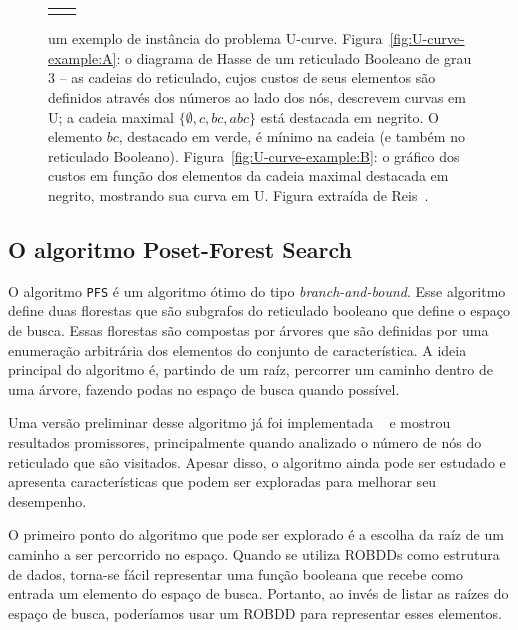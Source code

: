 \documentclass[12pt]{article}
\begin{document}
\begin{figure}[!ht]
\begin{tabular}{c c}
{        \label{fig:U-curve-example:B} 
    }
\end{tabular}
\caption{um exemplo de instância do problema U-curve. 
Figura~\ref{fig:U-curve-example:A}: o diagrama de Hasse de um reticulado
Booleano de grau $3$ -- as cadeias do reticulado, cujos custos de seus
elementos são definidos através dos números ao lado dos nós, descrevem
curvas em U; a cadeia maximal $\{ \emptyset, c, bc, abc \}$ está
destacada em negrito. O elemento $bc$, destacado em verde, é mínimo na
cadeia (e também no reticulado Booleano). 
Figura~\ref{fig:U-curve-example:B}: o gráfico dos custos em função dos
elementos da cadeia maximal destacada em negrito, mostrando sua curva em
U. Figura extraída de Reis~\cite{msreis thesis}.} 
    \label{fig:U-curve} 
\end{figure}


\subsection{O algoritmo Poset-Forest Search}
O algoritmo {\tt PFS} é um algoritmo ótimo do tipo 
{\em branch-and-bound}. Esse algoritmo define duas florestas que são 
subgrafos do reticulado booleano que define o espaço de busca. Essas
florestas são compostas por árvores que são definidas por uma enumeração
arbitrária dos elementos do conjunto de característica. A ideia 
principal do algoritmo é, partindo de um raíz, percorrer um caminho 
dentro de uma árvore, fazendo podas no espaço de busca quando possível.

Uma versão preliminar desse algoritmo já foi implementada 
~\cite{msreis thesis} e mostrou resultados promissores, principalmente
quando analizado o número de nós do reticulado que são visitados. Apesar
disso, o algoritmo ainda pode ser estudado e apresenta características
que podem ser exploradas para melhorar seu desempenho. 

O primeiro ponto do algoritmo que pode ser explorado é a escolha da raíz
de um caminho a ser percorrido no espaço. Quando se utiliza ROBDDs como 
estrutura de dados, torna-se fácil representar uma função booleana que
recebe como entrada um elemento do espaço de busca. Portanto, ao invés 
de listar as raízes do espaço de busca, poderíamos usar um ROBDD para 
representar esses elementos.
\end{document}
